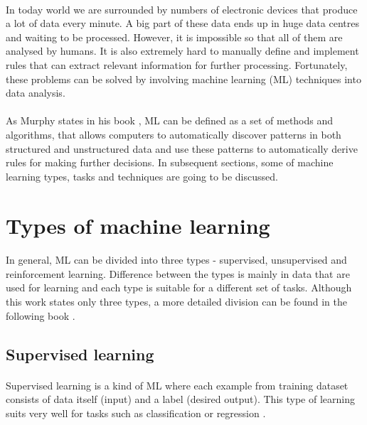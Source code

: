 \paragraph{}
In today world we are surrounded by numbers of electronic devices that produce a lot of data every minute. A big part of these data ends up in huge data centres and waiting to be processed. However, it is impossible so that all of them are analysed by humans. It is also extremely hard to manually define and implement rules that can extract relevant information for further processing. Fortunately, these problems can be solved by involving machine learning (ML) techniques into data analysis. 

\paragraph{}
As Murphy states in his book \cite{ml_probabilistic},  ML can be defined as a set of methods and algorithms, that allows computers to automatically discover patterns in both structured and unstructured data and use these patterns to automatically derive rules for making further decisions. In subsequent sections, some of machine learning types, tasks and techniques are going to be discussed. 

\section{Types of machine learning}
\paragraph{}
In general, ML can be divided into three types - supervised, unsupervised and reinforcement learning. Difference between the types is mainly in data that are used for learning and each type is suitable for a different set of tasks. Although this work states only three types, a more detailed division can be found in the following book \cite{ml_foundations}.

\subsection{Supervised learning}
\paragraph{}
Supervised learning is a kind of ML where each example from training dataset consists of data itself (input) and a label (desired output). This type of learning suits very well for tasks such as classification or regression \cite{python_ml_2nd}.

